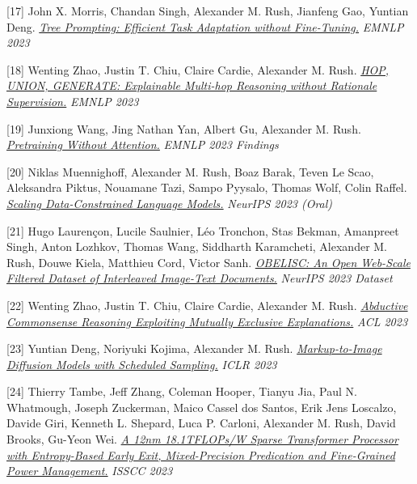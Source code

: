 \documentclass[10pt]{article}
\begin{document}
\medskip


[17] \ind John X. Morris, Chandan Singh, Alexander M. Rush, Jianfeng Gao, Yuntian Deng. \emph{\href{ https://arxiv.org/pdf/2310.14034.pdf }{ Tree Prompting: Efficient Task Adaptation without Fine-Tuning.} }\emph{ EMNLP 2023 }

\medskip


[18] \ind Wenting Zhao, Justin T. Chiu, Claire Cardie, Alexander M. Rush. \emph{\href{ https://arxiv.org/pdf/2305.14237.pdf }{ HOP, UNION, GENERATE: Explainable Multi-hop Reasoning without Rationale Supervision.} }\emph{ EMNLP 2023 }

\medskip


[19] \ind Junxiong Wang, Jing Nathan Yan, Albert Gu, Alexander M. Rush. \emph{\href{ https://arxiv.org/pdf/2212.10544.pdf }{ Pretraining Without Attention.} }\emph{ EMNLP 2023 Findings }

\medskip


[20] \ind Niklas Muennighoff, Alexander M. Rush, Boaz Barak, Teven Le Scao, Aleksandra Piktus, Nouamane Tazi, Sampo Pyysalo, Thomas Wolf, Colin Raffel. \emph{\href{ https://arxiv.org/pdf/2305.16264.pdf }{ Scaling Data-Constrained Language Models.} }\emph{ NeurIPS 2023 (Oral) }

\medskip


[21] \ind Hugo Laurençon, Lucile Saulnier, Léo Tronchon, Stas Bekman, Amanpreet Singh, Anton Lozhkov, Thomas Wang, Siddharth Karamcheti, Alexander M. Rush, Douwe Kiela, Matthieu Cord, Victor Sanh. \emph{\href{ https://arxiv.org/pdf/2306.16527.pdf }{ OBELISC: An Open Web-Scale Filtered Dataset of Interleaved Image-Text Documents.} }\emph{ NeurIPS 2023 Dataset }

\medskip


[22] \ind Wenting Zhao, Justin T. Chiu, Claire Cardie, Alexander M. Rush. \emph{\href{ https://arxiv.org/pdf/2305.14618.pdf }{ Abductive Commonsense Reasoning Exploiting Mutually Exclusive Explanations.} }\emph{ ACL 2023 }

\medskip


[23] \ind Yuntian Deng, Noriyuki Kojima, Alexander M. Rush. \emph{\href{ https://arxiv.org/abs/2210.05147 }{ Markup-to-Image Diffusion Models with Scheduled Sampling.} }\emph{ ICLR 2023 }

\medskip


[24] \ind Thierry Tambe, Jeff Zhang, Coleman Hooper, Tianyu Jia, Paul N. Whatmough, Joseph Zuckerman, Maico Cassel dos Santos, Erik Jens Loscalzo, Davide Giri, Kenneth L. Shepard, Luca P. Carloni, Alexander M. Rush, David Brooks, Gu-Yeon Wei. \emph{\href{ None }{ A 12nm 18.1TFLOPs/W Sparse Transformer Processor with Entropy-Based Early Exit, Mixed-Precision Predication and Fine-Grained Power Management.} }\emph{ ISSCC 2023 }
\end{document}
